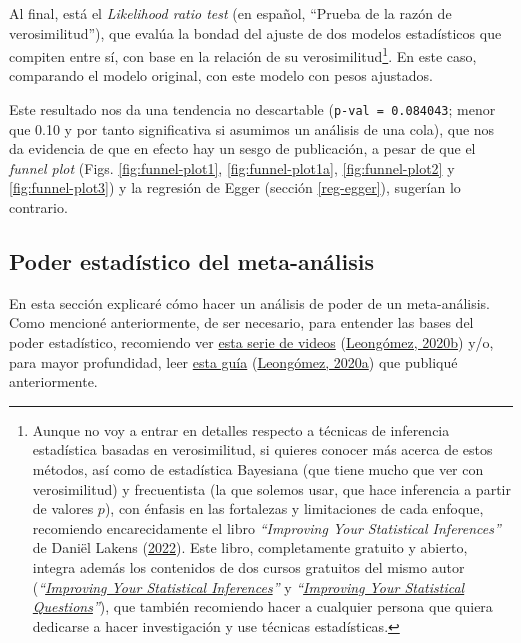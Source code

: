 \documentclass[
  bookmarksnumbered]{article}
\begin{document}
Al final, está el \emph{Likelihood ratio test} (en español, ``Prueba de la razón de verosimilitud''), que evalúa la bondad del ajuste de dos modelos estadísticos que compiten entre sí, con base en la relación de su verosimilitud\footnote{Aunque no voy a entrar en detalles respecto a técnicas de inferencia estadística basadas en verosimilitud, si quieres conocer más acerca de estos métodos, así como de estadística Bayesiana (que tiene mucho que ver con verosimilitud) y frecuentista (la que solemos usar, que hace inferencia a partir de valores \(p\)), con énfasis en las fortalezas y limitaciones de cada enfoque, recomiendo encarecidamente el libro \emph{``Improving Your Statistical Inferences''} de Daniël Lakens (\protect\hyperlink{ref-lakensImprovingYourStatistical2022}{2022}). Este libro, completamente gratuito y abierto, integra además los contenidos de dos cursos gratuitos del mismo autor (\emph{``\href{https://www.coursera.org/learn/statistical-inferences}{Improving Your Statistical Inferences}''} y \emph{``\href{https://www.coursera.org/learn/improving-statistical-questions}{Improving Your Statistical Questions}''}), que también recomiendo hacer a cualquier persona que quiera dedicarse a hacer investigación y use técnicas estadísticas.}. En este caso, comparando el modelo original, con este modelo con pesos ajustados.

Este resultado nos da una tendencia no descartable (\texttt{p-val\ =\ 0.084043}; menor que 0.10 y por tanto significativa si asumimos un análisis de una cola), que nos da evidencia de que en efecto hay un sesgo de publicación, a pesar de que el \emph{funnel plot} (Figs. \ref{fig:funnel-plot1}, \ref{fig:funnel-plot1a}, \ref{fig:funnel-plot2} y \ref{fig:funnel-plot3}) y la regresión de Egger (sección \ref{reg-egger}), sugerían lo contrario.

\hypertarget{poder-inf}{%
\subsection{Poder estadístico del meta-análisis}\label{poder-inf}}

En esta sección explicaré cómo hacer un análisis de poder de un meta-análisis.
Como mencioné anteriormente, de ser necesario, para entender las bases del poder estadístico, recomiendo ver \href{https://youtube.com/playlist?list\%20=\%20PLHk7UNt35ccVdyHqnQ6oXVYA6JBNFrE1x}{esta serie de videos} (\protect\hyperlink{ref-leongomezPoderRvid2020}{Leongómez, 2020b}) y/o, para mayor profundidad, leer \href{https://doi.org/10.5281/zenodo.3988776}{esta guía} (\protect\hyperlink{ref-leongomezAnalisisPoderEstadistico2020}{Leongómez, 2020a}) que publiqué anteriormente.
\end{document}
